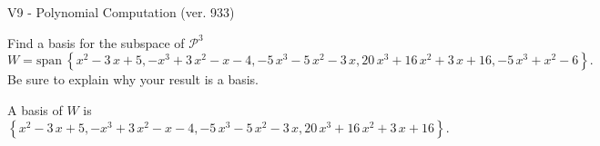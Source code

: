 \begin{exercise}
  \begin{exerciseTitle}V9 - Polynomial Computation (ver. 933)\end{exerciseTitle}
  \begin{exerciseStatement}
    Find a basis for the subspace of \(\mathcal{P}^3\) 
\[W=\mathrm{span}\ \left\{x^{2} - 3 \, x + 5 , -x^{3} + 3 \, x^{2} - x - 4 , -5 \, x^{3} - 5 \, x^{2} - 3 \, x , 20 \, x^{3} + 16 \, x^{2} + 3 \, x + 16 , -5 \, x^{3} + x^{2} - 6\right\}.\]
 Be sure to explain why your result is a basis.


  \end{exerciseStatement}
  \begin{exerciseAnswer}
   A basis of \(W\) is  \(\left\{x^{2} - 3 \, x + 5 , -x^{3} + 3 \, x^{2} - x - 4 , -5 \, x^{3} - 5 \, x^{2} - 3 \, x , 20 \, x^{3} + 16 \, x^{2} + 3 \, x + 16\right\}\).
  


  \end{exerciseAnswer}
\end{exercise}